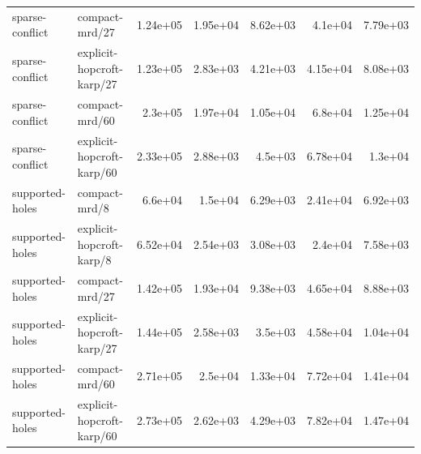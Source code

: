 \begin{table}[t]
\begin{tabular}{llrrrrr}
sparse-conflict & compact-mrd/27 & 1.24e+05 & 1.95e+04 & 8.62e+03 & 4.1e+04 & 7.79e+03 \\
sparse-conflict & explicit-hopcroft-karp/27 & 1.23e+05 & 2.83e+03 & 4.21e+03 & 4.15e+04 & 8.08e+03 \\
sparse-conflict & compact-mrd/60 & 2.3e+05 & 1.97e+04 & 1.05e+04 & 6.8e+04 & 1.25e+04 \\
sparse-conflict & explicit-hopcroft-karp/60 & 2.33e+05 & 2.88e+03 & 4.5e+03 & 6.78e+04 & 1.3e+04 \\
supported-holes & compact-mrd/8 & 6.6e+04 & 1.5e+04 & 6.29e+03 & 2.41e+04 & 6.92e+03 \\
supported-holes & explicit-hopcroft-karp/8 & 6.52e+04 & 2.54e+03 & 3.08e+03 & 2.4e+04 & 7.58e+03 \\
supported-holes & compact-mrd/27 & 1.42e+05 & 1.93e+04 & 9.38e+03 & 4.65e+04 & 8.88e+03 \\
supported-holes & explicit-hopcroft-karp/27 & 1.44e+05 & 2.58e+03 & 3.5e+03 & 4.58e+04 & 1.04e+04 \\
supported-holes & compact-mrd/60 & 2.71e+05 & 2.5e+04 & 1.33e+04 & 7.72e+04 & 1.41e+04 \\
supported-holes & explicit-hopcroft-karp/60 & 2.73e+05 & 2.62e+03 & 4.29e+03 & 7.82e+04 & 1.47e+04 \\
\bottomrule
\end{tabular}
\end{table}
